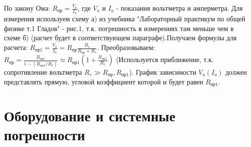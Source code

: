 \documentclass[a4paper]{article}
\begin{document}
По закону Ома: $R_\text{пр} = \frac{V_{a}}{I_{a}}$, где $V_{a}$ и $I_{a}$ - показания вольтметра и амперметра. Для измерения используем схему а) из учебника "Лабораторный практикум по общей физике т.1 Гладов" - рис.1, т.к. погрешность в измерениях там меньше чем в схеме б) (расчет будет в соответствующем параграфе).Получаем формулы для расчета: $R_\text{пр1} = \frac{V_{a}}{I_{a}} = R_\text{пр}\frac{R_{v}}{R_\text{пр} + R_{v}}$. Преобразовываем: $ R_\text{пр} = \frac{R_\text{пр1}}{1-(R_\text{пр1}/R_{v})} \approx R_\text{пр1}(1 + \frac{R_\text{пр1}}{R_{v}})$ (Используется приближение, т.к. сопротивление вольтметра $R_{v} \gg R_\text{пр},R_\text{пр1}$).\newline
График зависимости $V_{a}(I_{a})$ должен представлять прямую, угловой коэффициент которой и будет равен $R_{пр1}$.

\section{Оборудование и системные погрешности}
\end{document}
